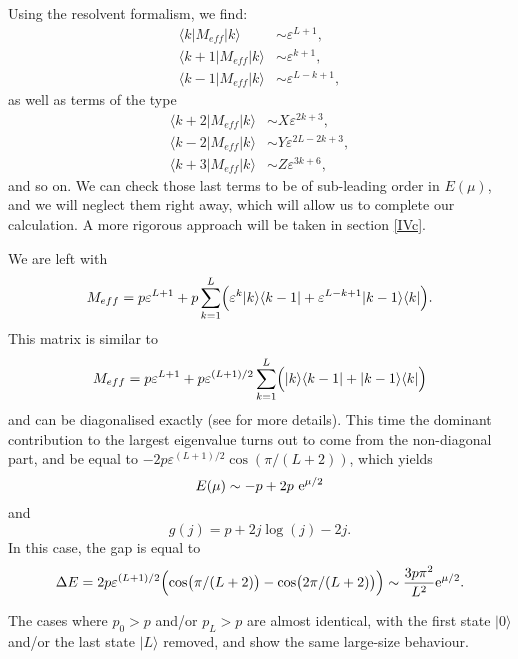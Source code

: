 \documentclass[aps,pre,onecolumn,showpacs,showkeys,a4paper]{revtex4-1}
\begin{document}
Using the resolvent formalism, we find:
\begin{align}
\langle k| M_{eff} |k\rangle&\sim\varepsilon^{L+1},\\
\langle k+1| M_{eff} |k\rangle&\sim\varepsilon^{k+1},\\
\langle k-1| M_{eff} |k\rangle&\sim\varepsilon^{L-k+1},
\end{align}
as well as terms of the type
\begin{align}
\langle k+2| M_{eff} |k\rangle&\sim X\varepsilon^{2k+3},\\
\langle k-2| M_{eff} |k\rangle&\sim Y\varepsilon^{2L-2k+3},\\
\langle k+3| M_{eff} |k\rangle&\sim Z\varepsilon^{3k+6},
\end{align}
and so on. We can check those last terms to be of sub-leading order in $E(\mu)$, and we will neglect them right away, which will allow us to complete our calculation. A more rigorous approach will be taken in section \ref{IVc}.

We are left with
\begin{equation}
M_{eff}=p\varepsilon^{L+1}+p\sum\limits_{k=1}^{L}\Bigl(\varepsilon^{k}|k\rangle\langle k-1|+\varepsilon^{L-k+1}|k-1\rangle\langle k|\Bigr).
\end{equation}
This matrix is similar to
\begin{equation}
M_{eff}=p\varepsilon^{L+1}+p\varepsilon^{(L+1)/2}\sum\limits_{k=1}^{L}\Bigl(|k\rangle\langle k-1|+|k-1\rangle\langle k|\Bigr)
\end{equation}
and can be diagonalised exactly (see \cite{Lazarescu2015} for more details). This time the dominant contribution to the largest eigenvalue turns out to come from the non-diagonal part, and be equal to $-2p\varepsilon^{(L+1)/2}\cos(\pi/(L+2))$, which yields
\begin{equation}\label{IV-3-EER-}
E(\mu)\sim-p+2p~{\rm e}^{\mu/2}
\end{equation}
and
\begin{equation}\label{IV-3-gjLDc}\boxed{
g(j)=p+2j\log(j)-2j.
}\end{equation}
In this case, the gap is equal to
\begin{equation}
\Delta E=2p\varepsilon^{(L+1)/2}\Bigl(\cos\bigl(\pi/(L+2)\bigr)-\cos\bigl(2 \pi/(L+2)\bigr)\Bigr)\sim  \frac{3p\pi^2}{L^2}{\rm e}^{\mu/2}.
\end{equation}

The cases where $p_0>p$ and/or $p_L>p$ are almost identical, with the first state $|0\rangle$ and/or the last state $|L\rangle$ removed, and show the same large-size behaviour.
\end{document}
